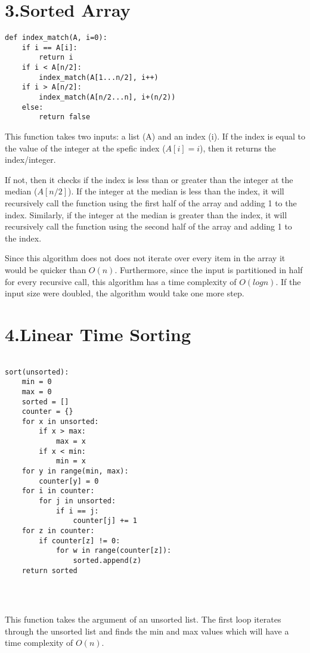 \documentclass[11pt]{article}
\begin{document}
\newpage
\section*{3.Sorted Array}
\begin{lstlisting}
def index_match(A, i=0):
	if i == A[i]:
		return i
	if i < A[n/2]:
		index_match(A[1...n/2], i++)
	if i > A[n/2]:
		index_match(A[n/2...n], i+(n/2))
	else:
		return false
\end{lstlisting}

This function takes two inputs: a list (A) and an index (i). If the index is equal to the value of the integer at the spefic index ($A[i] = i$), then it returns the index/integer. 

If not, then it checks if the index is less than or greater than the integer at the median ($A[n/2]$). If the integer at the median is less than the index, it will recursively call the function using the first half of the array and adding 1 to the index. Similarly, if the integer at the median is greater than the index, it will recursively call the function using the second half of the array and adding 1 to the index.

Since this algorithm does not does not iterate over every item in the array it would be quicker than $O(n)$. Furthermore, since the input is partitioned in half for every recursive call, this algorithm has a time complexity of $O(logn)$. If the input size were doubled, the algorithm would take one more step. 


\newpage
\section*{4.Linear Time Sorting}

\begin{lstlisting}

sort(unsorted):
	min = 0
	max = 0
	sorted = []
	counter = {}
	for x in unsorted:
		if x > max:
			max = x
		if x < min:
			min = x
	for y in range(min, max):
		counter[y] = 0
	for i in counter:
		for j in unsorted:
			if i == j:
				counter[j] += 1
	for z in counter:
		if counter[z] != 0:
			for w in range(counter[z]):
				sorted.append(z)
	return sorted




\end{lstlisting}

This function takes the argument of an unsorted list. The first loop iterates through the unsorted list and finds the min and max values which will have a time complexity of $O(n)$. 
\end{document}
